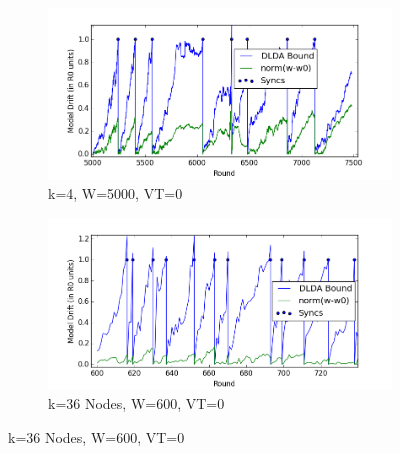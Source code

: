 \begin{figure}[ht!]
    \centering
    \begin{subfigure}[b]{0.5\textwidth}
        \includegraphics[width=\textwidth]{PowerSupply/4nodes.png}
        \caption{k=4, W=5000, VT=0}
    \end{subfigure}

    \begin{subfigure}[b]{0.5\textwidth}
        \includegraphics[width=\textwidth]{PowerSupply/36nodes.png}
        \caption{k=36 Nodes, W=600, VT=0}
    \end{subfigure}


\end{figure}
